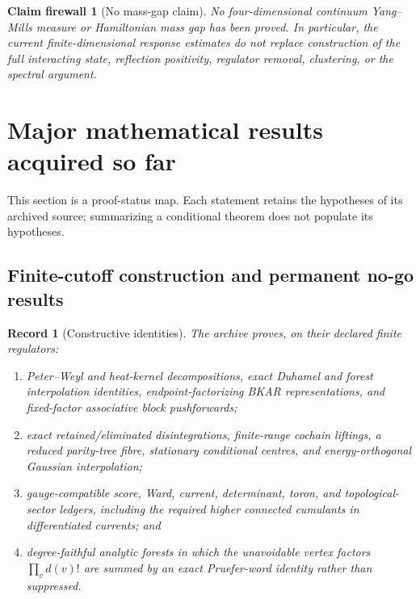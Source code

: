 \documentclass[11pt,oneside]{article}
\newtheorem{firewall}[theorem]{Claim firewall}
\newtheorem{record}[theorem]{Record}
\theoremstyle{definition}
\theoremstyle{remark}
\begin{document}
\begin{firewall}[No mass-gap claim]
\label{fire:newv1-no-gap}
No four-dimensional continuum Yang--Mills measure or Hamiltonian
mass gap has been proved.  In particular, the current
finite-dimensional response estimates do not replace construction
of the full interacting state, reflection positivity, regulator
removal, clustering, or the spectral argument.
\end{firewall}

\section{Major mathematical results acquired so far}
\label{sec:newv1-summary}

This section is a proof-status map.  Each statement retains the
hypotheses of its archived source; summarizing a conditional theorem
does not populate its hypotheses.

\subsection{Finite-cutoff construction and permanent no-go results}

\begin{record}[Constructive identities]
\label{rec:newv1-constructive}
The archive proves, on their declared finite regulators:
\begin{enumerate}[label=\textup{(\roman*)},leftmargin=3.3em]
\item Peter--Weyl and heat-kernel decompositions, exact Duhamel and
forest interpolation identities, endpoint-factorizing BKAR
representations, and fixed-factor associative block pushforwards;
\item exact retained/eliminated disintegrations, finite-range cochain
liftings, a reduced parity-tree fibre, stationary conditional
centres, and energy-orthogonal Gaussian interpolation;
\item gauge-compatible score, Ward, current, determinant, toron, and
topological-sector ledgers, including the required higher connected
cumulants in differentiated currents; and
\item degree-faithful analytic forests in which the unavoidable
vertex factors \(\prod_v d(v)!\) are summed by an exact
Pruefer-word identity rather than suppressed.
\end{enumerate}
\end{record}
\end{document}
